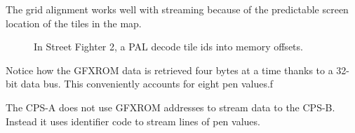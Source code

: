 The grid alignment works well with streaming because of the predictable screen location of the tiles in the map.

 \begin{figure}[H]%
 \caption*{In Street Fighter 2, a PAL  decode tile ids into memory offsets.}%
 \end{figure}%

Notice how the GFXROM data is retrieved four bytes at a time thanks to a 32-bit data bus. This conveniently accounts for eight pen values.f

The CPS-A does not use GFXROM addresses to stream data to the CPS-B. Instead it uses identifier code to stream lines of pen values. 













